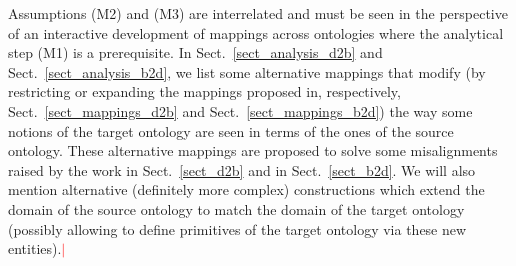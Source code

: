\documentclass[ao]{iosart2x}
\newcommand{\nb}[1]{\textcolor{red}{$|$}\marginpar{\hspace*{-0cm}\parbox{20mm}{\scriptsize\raggedright\textcolor{red}{#1}}}}
\newcommand{\pr}[1]{\mathtt{#1}}
\newcommand{\cn}[1]{\mathtt{#1}}
\newcommand{\dolce}{{\textsc{dolce}}}
\newcommand{\bfo}{{\textsc{bfo}}}
\newcommand {\EDdcat} {\textsc{ed}}
\newcommand {\PDdcat} {\textsc{pd}}
\newcommand {\TPd} {\ensuremath{\pr{tP}}}
\newcommand {\Pd} {\ensuremath{\pr{P}}}
\newcommand{\cntbcat}{\cn{cnt}}
\newcommand{\occbcat}{\cn{occ}}
\newcommand{\bfocpart}{\pr{cP}}
\newcommand{\bfoopart}{\pr{oP}}
\begin{document}
Assumptions (M2) and (M3) are interrelated and must be seen in the perspective of an interactive development of mappings across ontologies where the analytical step (M1) is a prerequisite. In Sect.~\ref{sect_analysis_d2b} and Sect.~\ref{sect_analysis_b2d}, we list some alternative mappings that modify (by restricting or expanding the mappings proposed in, respectively, Sect.~\ref{sect_mappings_d2b} and Sect.~\ref{sect_mappings_b2d}) the way some notions of the target ontology are seen in terms of the ones of the source ontology. These alternative mappings are proposed to solve some misalignments raised by the work in Sect.~\ref{sect_d2b} and in Sect.~\ref{sect_b2d}. We will also mention alternative (definitely more complex) constructions which extend the domain of the source ontology to match the domain of the target ontology (possibly allowing to define primitives of the target ontology via these new entities).\nb{CM: qui cosa volevamo dire?} 
 
\end{document}
